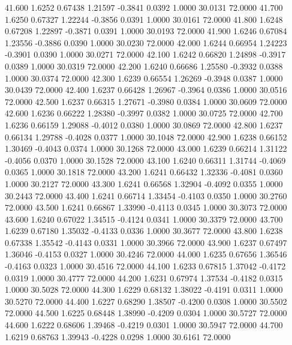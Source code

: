  41.600   1.6252   0.67438   1.21597  -0.3841   0.0392   1.0000  30.0131  72.0000
  41.700   1.6250   0.67327   1.22244  -0.3856   0.0391   1.0000  30.0161  72.0000
  41.800   1.6248   0.67208   1.22897  -0.3871   0.0391   1.0000  30.0193  72.0000
  41.900   1.6246   0.67084   1.23556  -0.3886   0.0390   1.0000  30.0230  72.0000
  42.000   1.6244   0.66954   1.24223  -0.3901   0.0390   1.0000  30.0271  72.0000
  42.100   1.6242   0.66820   1.24898  -0.3917   0.0389   1.0000  30.0319  72.0000
  42.200   1.6240   0.66686   1.25580  -0.3932   0.0388   1.0000  30.0374  72.0000
  42.300   1.6239   0.66554   1.26269  -0.3948   0.0387   1.0000  30.0439  72.0000
  42.400   1.6237   0.66428   1.26967  -0.3964   0.0386   1.0000  30.0516  72.0000
  42.500   1.6237   0.66315   1.27671  -0.3980   0.0384   1.0000  30.0609  72.0000
  42.600   1.6236   0.66222   1.28380  -0.3997   0.0382   1.0000  30.0725  72.0000
  42.700   1.6236   0.66159   1.29088  -0.4012   0.0380   1.0000  30.0869  72.0000
  42.800   1.6237   0.66134   1.29788  -0.4028   0.0377   1.0000  30.1048  72.0000
  42.900   1.6238   0.66152   1.30469  -0.4043   0.0374   1.0000  30.1268  72.0000
  43.000   1.6239   0.66214   1.31122  -0.4056   0.0370   1.0000  30.1528  72.0000
  43.100   1.6240   0.66311   1.31744  -0.4069   0.0365   1.0000  30.1818  72.0000
  43.200   1.6241   0.66432   1.32336  -0.4081   0.0360   1.0000  30.2127  72.0000
  43.300   1.6241   0.66568   1.32904  -0.4092   0.0355   1.0000  30.2443  72.0000
  43.400   1.6241   0.66714   1.33454  -0.4103   0.0350   1.0000  30.2760  72.0000
  43.500   1.6241   0.66867   1.33990  -0.4113   0.0345   1.0000  30.3073  72.0000
  43.600   1.6240   0.67022   1.34515  -0.4124   0.0341   1.0000  30.3379  72.0000
  43.700   1.6239   0.67180   1.35032  -0.4133   0.0336   1.0000  30.3677  72.0000
  43.800   1.6238   0.67338   1.35542  -0.4143   0.0331   1.0000  30.3966  72.0000
  43.900   1.6237   0.67497   1.36046  -0.4153   0.0327   1.0000  30.4246  72.0000
  44.000   1.6235   0.67656   1.36546  -0.4163   0.0323   1.0000  30.4516  72.0000
  44.100   1.6233   0.67815   1.37042  -0.4172   0.0319   1.0000  30.4777  72.0000
  44.200   1.6231   0.67974   1.37534  -0.4182   0.0315   1.0000  30.5028  72.0000
  44.300   1.6229   0.68132   1.38022  -0.4191   0.0311   1.0000  30.5270  72.0000
  44.400   1.6227   0.68290   1.38507  -0.4200   0.0308   1.0000  30.5502  72.0000
  44.500   1.6225   0.68448   1.38990  -0.4209   0.0304   1.0000  30.5727  72.0000
  44.600   1.6222   0.68606   1.39468  -0.4219   0.0301   1.0000  30.5947  72.0000
  44.700   1.6219   0.68763   1.39943  -0.4228   0.0298   1.0000  30.6161  72.0000
